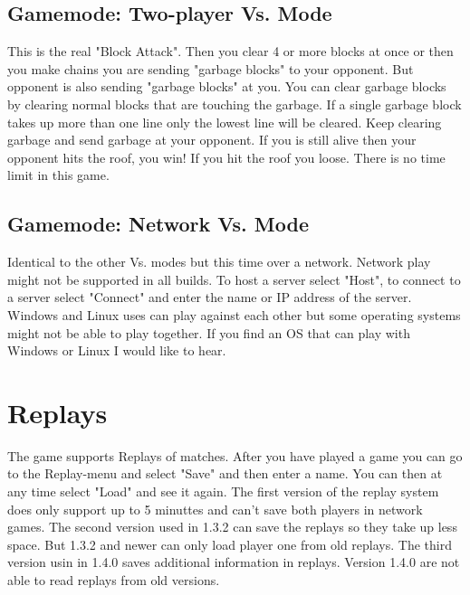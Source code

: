 \documentclass[11pt,a4paper]{article}
\begin{document}
\subsection{Gamemode: Two-player Vs. Mode}
This is the real "Block Attack". Then you clear 4 or more blocks
at once or then you make chains you are sending "garbage blocks"
to your opponent. But opponent is also sending "garbage blocks" at
you. You can clear garbage blocks by clearing normal blocks that
are touching the garbage. If a single garbage block takes up more
than one line only the lowest line will be cleared. Keep clearing
garbage and send garbage at your opponent. If you is still alive
then your opponent hits the roof, you win! If you hit the roof you
loose. There is no time limit in this game.
\subsection{Gamemode: Network Vs. Mode}
Identical to the other Vs. modes but this time over a network. Network play might not be supported in all builds.
\newline To host a server select "Host", to connect to a server select "Connect" and enter the name or IP address of the server.
Windows and Linux uses can play against each other but some operating systems might not be able to play together. If you find an OS that can play with Windows or Linux I would like to hear.

\section{Replays}
The game supports Replays of matches. After you have played a game you can go to the Replay-menu and select "Save" and then enter a name. You can then at any time select "Load" and see it again. The first version of the replay system does only support up to 5 minuttes and can't save both players in network games. \newline
The second version used in 1.3.2 can save the replays so they take up less space. But 1.3.2 and newer can only load player one from old replays. \newline
The third version usin in 1.4.0 saves additional information in replays. Version 1.4.0 are not able to read replays from old versions.
\end{document}
